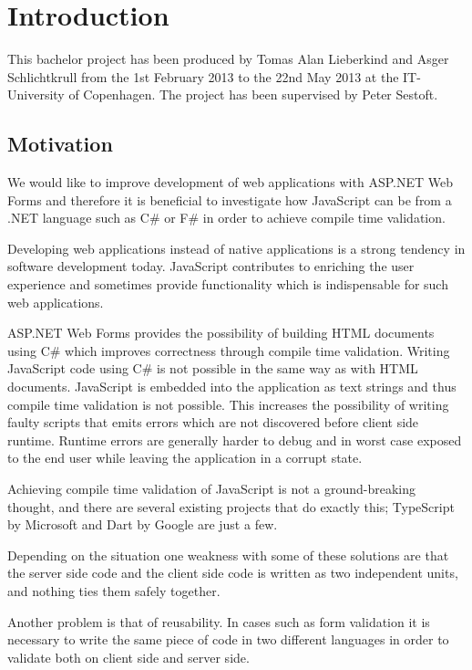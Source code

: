 
\chapter{Introduction} %
\label{cha:introduction}
	This bachelor project has been produced by Tomas Alan Lieberkind and Asger Schlichtkrull from the 1st February 2013 to the 22nd May 2013 at the IT-University of Copenhagen. The project has been supervised by Peter Sestoft.

	\section{Motivation} %
\label{sec:motivation}
	We would like to improve development of web applications with ASP.NET Web Forms and therefore it is beneficial to investigate how JavaScript can be from a .NET language such as C\# or F\# in order to achieve compile time validation. %

	Developing web applications instead of native applications is a strong tendency in software development today. JavaScript contributes to enriching the user experience and sometimes provide functionality which is indispensable for such web applications.

	ASP.NET Web Forms provides the possibility of building HTML documents using C\# which improves correctness through compile time validation. Writing JavaScript code using C\# is not possible in the same way as with HTML documents. JavaScript is embedded into the application as text strings and thus compile time validation is not possible. This increases the possibility of writing faulty scripts that emits errors which are not discovered before client side runtime. Runtime errors are generally harder to debug and in worst case exposed to the end user while leaving the application in a corrupt state.

	Achieving compile time validation of JavaScript is not a ground-breaking thought, and there are several existing projects that do exactly this; TypeScript by Microsoft and Dart by Google are just a few.

	Depending on the situation one weakness with some of these solutions are that the server side code and the client side code is written as two independent units, and nothing ties them safely together. 

	Another problem is that of reusability. In cases such as form validation it is necessary to write the same piece of code in two different languages in order to validate both on client side and server side.

